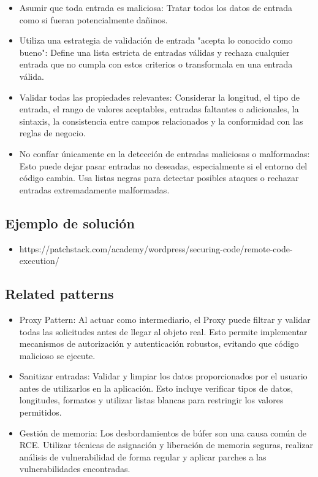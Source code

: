 \begin{itemize}
    \item Asumir que toda entrada es maliciosa: Tratar todos los datos de entrada como si fueran potencialmente dañinos.
    \item Utiliza una estrategia de validación de entrada "acepta lo conocido como bueno": Define una lista estricta de entradas válidas y rechaza cualquier entrada que no cumpla con estos criterios o transformala en una entrada válida.
    \item Validar todas las propiedades relevantes: Considerar la longitud, el tipo de entrada, el rango de valores aceptables, entradas faltantes o adicionales, la sintaxis, la consistencia entre campos relacionados y la conformidad con las reglas de negocio.
    \item No confíar únicamente en la detección de entradas maliciosas o malformadas: Esto puede dejar pasar entradas no deseadas, especialmente si el entorno del código cambia. Usa listas negras para detectar posibles ataques o rechazar entradas extremadamente malformadas.
\end{itemize}

\subsection{Ejemplo de solución}

\begin{itemize}
    \item https://patchstack.com/academy/wordpress/securing-code/remote-code-execution/
\end{itemize}

\subsection{Related patterns}

\begin{itemize}
    \item Proxy Pattern: Al actuar como intermediario, el Proxy puede filtrar y validar todas las solicitudes antes de llegar al objeto real. Esto permite implementar mecanismos de autorización y autenticación robustos, evitando que código malicioso se ejecute.
    \item Sanitizar entradas: Validar y limpiar los datos proporcionados por el usuario antes de utilizarlos en la aplicación. Esto incluye verificar tipos de datos, longitudes, formatos y utilizar listas blancas para restringir los valores permitidos.
    \item Gestión de memoria: Los desbordamientos de búfer son una causa común de RCE. Utilizar técnicas de asignación y liberación de memoria seguras, realizar análisis de vulnerabilidad de forma regular y aplicar parches a las vulnerabilidades encontradas.
\end{itemize}
